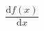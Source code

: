 \documentclass[preview]{standalone}
\begin{document}
\begin{align*}
\dfrac{\mathrm{d}f(x)}{\mathrm{d}x}
\end{align*}
\end{document}
